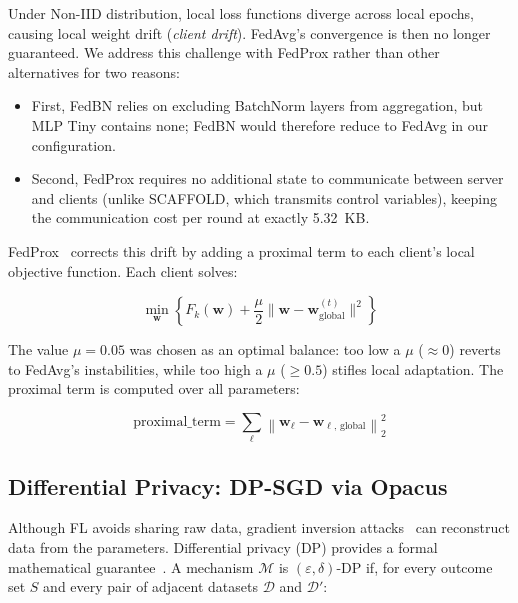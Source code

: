 \documentclass{article}
\begin{document}
Under Non-IID distribution, local loss functions diverge across local epochs,
causing local weight drift (\textit{client drift}). FedAvg's convergence is then no
longer guaranteed. We address this challenge with FedProx rather than other
alternatives for two reasons:

\begin{itemize}
  \item First, FedBN relies on excluding BatchNorm layers from aggregation, but MLP
  Tiny contains none; FedBN would therefore reduce to FedAvg in our configuration.
  \item Second, FedProx requires no additional state to communicate between server
  and clients (unlike SCAFFOLD, which transmits control variables), keeping the
  communication cost per round at exactly 5.32~KB.
\end{itemize}

FedProx~\cite{li2020fedprox} corrects this drift by adding a proximal term to each
client's local objective function. Each client solves:

\begin{equation}
  \min_{\mathbf{w}} \left\{ F_k(\mathbf{w}) + \frac{\mu}{2}
  \| \mathbf{w} - \mathbf{w}^{(t)}_{\text{global}} \|^2 \right\}
  \label{eq:fedprox_form}
\end{equation}

The value $\mu = 0.05$ was chosen as an optimal balance: too low a $\mu$
($\approx 0$) reverts to FedAvg's instabilities, while too high a $\mu$
($\geq 0.5$) stifles local adaptation. The proximal term is computed over all
parameters:

\begin{equation}
  \text{proximal\_term} = \sum_{\ell} \left\|
  \mathbf{w}_\ell - \mathbf{w}_{\ell,\,\text{global}} \right\|^2_2
  \label{eq:proxterm}
\end{equation}

\subsection{Differential Privacy: DP-SGD via Opacus}
\label{subsec:dp}

Although FL avoids sharing raw data, gradient inversion
attacks~\cite{geiping2020inverting} can reconstruct data from the parameters.
Differential privacy (DP) provides a formal mathematical
guarantee~\cite{dwork2014foundations}. A mechanism $\mathcal{M}$ is $(\varepsilon,
\delta)$-DP if, for every outcome set $S$ and every pair of adjacent datasets
$\mathcal{D}$ and $\mathcal{D}'$:
\end{document}
